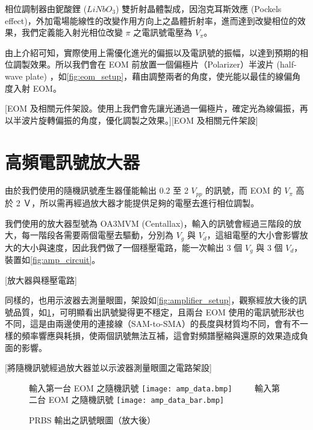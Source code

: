\documentclass[class=NCU_thesis, crop=false]{standalone}
\begin{document}
相位調制器由鈮酸鋰 ($LiNbO_{3}$) 雙折射晶體製成，因泡克耳斯效應 (Pockels effect)，外加電場能線性的改變作用方向上之晶體折射率，進而達到改變相位的效果，我們定義能入射光相位改變 $\pi$ 之電訊號電壓為 $V_{\pi}$。

由上介紹可知，實際使用上需優化進光的偏振以及電訊號的振幅，以達到預期的相位調製效果。所以我們會在 EOM 前放置一個偏極片（Polarizer）半波片 (half-wave plate) ，如\cref{fig:eom_setup}，藉由調整兩者的角度，使光能以最佳的線偏角度入射 EOM。

[EOM 及相關元件架設。使用上我們會先讓光通過一偏極片，確定光為線偏振，再以半波片旋轉偏振的角度，優化調製之效果。][EOM 及相關元件架設]

\section{高頻電訊號放大器}

由於我們使用的隨機訊號產生器僅能輸出 0.2 至 2 $V_{pp}$ 的訊號，而 EOM 的 $V_{\pi}$ 高於 2 Ｖ，所以需再經過放大器才能提供足夠的電壓去進行相位調製。

我們使用的放大器型號為 OA3MVM (Centallax)，輸入的訊號會經過三階段的放大，每一階段各需要兩個電壓去驅動，分別為 $V_{g}$ 與 $V_{d}$，這組電壓的大小會影響放大的大小與速度，因此我們做了一個穩壓電路，能一次輸出 3 個 $V_{g}$ 與 3 個 $V_{d}$，裝置如\cref{fig:amp_circuit}。

[放大器與穩壓電路]

同樣的，也用示波器去測量眼圖，架設如\cref{fig:amplifier_setup}，觀察經放大後的訊號品質，如\cref{fig:amp_prbs_eye}，可明顯看出訊號變得更不穩定，且兩台 EOM 使用的電訊號形狀也不同，這是由兩邊使用的連接線（SAM-to-SMA）的長度與材質均不同，會有不一樣的頻率響應與耗損，使兩個訊號無法互補，這會對頻譜壓縮與還原的效果造成負面的影響。

[將隨機訊號經過放大器並以示波器測量眼圖之電路架設]

\begin{figure}[!hbt]
    \centering
    \subcaptionbox
        {輸入第一台 EOM 之隨機訊號
        \label{fig:subfig_fig1}}
        {\texttt{[image: amp\_data.bmp]}}
    ~~~~
    \subcaptionbox
        {輸入第二台 EOM 之隨機訊號
        \label{fig:subfig_fig2}}
        {\texttt{[image: amp\_data\_bar.bmp]}}
    \caption{PRBS 輸出之訊號眼圖（放大後）}
    \label{fig:amp_prbs_eye}
\end{figure}
\end{document}
